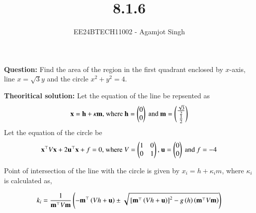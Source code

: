\documentclass[journal]{IEEEtran}
\begin{document}

\vspace{3cm}

\title{8.1.6}
\author{EE24BTECH11002 - Agamjot Singh}
{\let\newpage\relax\maketitle}

\renewcommand{\thefigure}{\theenumi}
\renewcommand{\thetable}{\theenumi}
\setlength{\intextsep}{10pt} %

\textbf{Question:}
\newline
Find the area of the region in the first quadrant enclosed by $x$-axis, line $x = \sqrt{3}y$ and the circle $x^2 + y^2 = 4$.

\textbf{Theoritical solution:}
\newline
Let the equation of the line be repsented as
\begin{align}
    \mathbf{x} = \mathbf{h} + \kappa \mathbf{m} \text{, where } \mathbf{h} = \begin{pmatrix}0\\0\end{pmatrix} \text{ and } \mathbf{m} = \begin{pmatrix}\frac{\sqrt{3}}{2} \\ \frac{1}{2}\end{pmatrix}
\end{align}
Let the equation of the circle be 
\begin{align}
    \mathbf{x}^{\top} V \mathbf{x} + 2\mathbf{u}^{\top}\mathbf{x} + f = 0 \text{, where } V = \begin{pmatrix}1 & 0\\0 & 1\end{pmatrix} \text{, } \mathbf{u} = \begin{pmatrix}0\\0\end{pmatrix} \text{ and } f = - 4
\end{align}

Point of intersection of the line with the circle is given by $x_i = h + \kappa_im$, where $\kappa_i$ is calculated as,

\begin{align}
    k_i=\frac{1}{\mathbf{m}^\top V \mathbf{m}}\left(-\mathbf{m}^\top \left(Vh+\mathbf{u}\right)\pm \sqrt{{}\left[\mathbf{m}^\top \left(Vh+\mathbf{u}\right)\right]^2-g\left(h\right)\left(\mathbf{m}^\top V \mathbf{m}\right)}\right)
\end{align}
\end{document}
